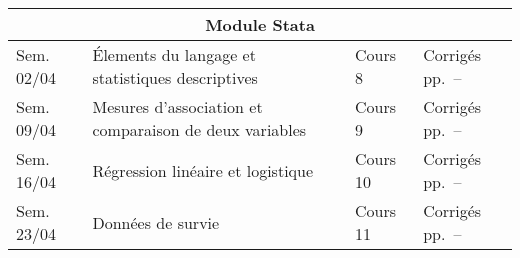 \documentclass[11pt]{report}
\theoremstyle{definition}
\newcommand{\blankpage}{
  \newpage
  \thispagestyle{empty}
  \mbox{}
  \newpage
  }
\begin{document}
\begin{center}
\begin{tabular}{|l|p{10cm}|l|l|}
\hline
  \multicolumn{4}{|c|}{Module Stata} \\
\hline
  Sem. 02/04 & Élements du langage et statistiques descriptives & Cours 8 &
  Corrigés pp.~\pageref{start:sol1stata}–\pageref{stop:sol1stata}\\
  Sem. 09/04 & Mesures d'association et comparaison de deux variables &
  Cours 9 & Corrigés pp.~\pageref{start:sol2stata}–\pageref{stop:sol2stata}\\
  Sem. 16/04 & Régression linéaire et logistique & Cours 10 & Corrigés pp.~\pageref{start:sol3stata}–\pageref{stop:sol3stata}\\
  Sem. 23/04 & Données de survie & Cours 11 & Corrigés pp.~\pageref{start:sol4stata}–\pageref{stop:sol4stata}\\
\hline
\end{tabular}
\end{center}


\setcounter{page}{1}


\cleardoublepage

\blankpage
\blankpage

\thispagestyle{empty}
\end{document}
